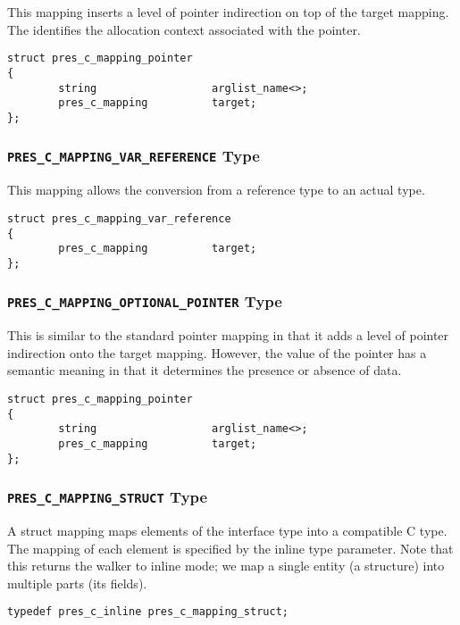 This mapping inserts a level of pointer indirection on top of the target
mapping.  The  identifies the allocation context 
associated with the pointer.

\begin{verbatim}
struct pres_c_mapping_pointer
{
        string                  arglist_name<>;
        pres_c_mapping          target;
};
\end{verbatim}

\subsubsection{\texttt{PRES\_C\_MAPPING\_VAR\_REFERENCE} Type}

This mapping allows the conversion from a reference type to an actual type.

\begin{verbatim}
struct pres_c_mapping_var_reference
{
        pres_c_mapping          target;
};
\end{verbatim}

\subsubsection{\texttt{PRES\_C\_MAPPING\_OPTIONAL\_POINTER} Type}

This is similar to the standard pointer mapping in that it adds a level of
pointer indirection onto the target mapping.  However, the value of the pointer
has a semantic meaning in that it determines the presence or absence of data.

\begin{verbatim}
struct pres_c_mapping_pointer
{
        string                  arglist_name<>;
        pres_c_mapping          target;
};
\end{verbatim}

\subsubsection{\texttt{PRES\_C\_MAPPING\_STRUCT} Type}

A struct mapping maps elements of the interface type into a compatible C type.
The mapping of each element is specified by the  inline
type parameter.  Note that this returns the \PRESC{} walker to inline mode; we
map a single entity (a structure) into multiple parts (its fields).

\begin{verbatim}
typedef pres_c_inline pres_c_mapping_struct;
\end{verbatim}

